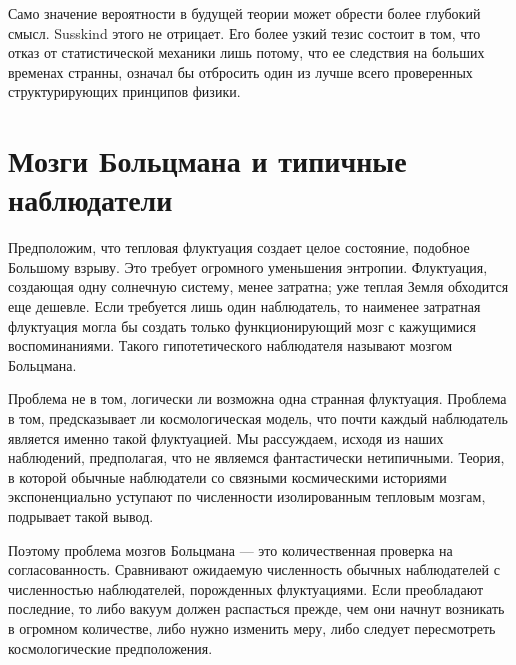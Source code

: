 \begin{classroomqa}
\end{classroomqa}

Само значение вероятности в будущей теории может обрести более глубокий смысл. Susskind этого не отрицает. Его более узкий тезис состоит в том, что отказ от статистической механики лишь потому, что ее следствия на больших временах странны, означал бы отбросить один из лучше всего проверенных структурирующих принципов физики.

\section{Мозги Больцмана и типичные наблюдатели}

Предположим, что тепловая флуктуация создает целое состояние, подобное Большому взрыву. Это требует огромного уменьшения энтропии. Флуктуация, создающая одну солнечную систему, менее затратна; уже теплая Земля обходится еще дешевле. Если требуется лишь один наблюдатель, то наименее затратная флуктуация могла бы создать только функционирующий мозг с кажущимися воспоминаниями. Такого гипотетического наблюдателя называют мозгом Больцмана.

Проблема не в том, логически ли возможна одна странная флуктуация. Проблема в том, предсказывает ли космологическая модель, что почти каждый наблюдатель является именно такой флуктуацией. Мы рассуждаем, исходя из наших наблюдений, предполагая, что не являемся фантастически нетипичными. Теория, в которой обычные наблюдатели со связными космическими историями экспоненциально уступают по численности изолированным тепловым мозгам, подрывает такой вывод.

Поэтому проблема мозгов Больцмана — это количественная проверка на согласованность. Сравнивают ожидаемую численность обычных наблюдателей с численностью наблюдателей, порожденных флуктуациями. Если преобладают последние, то либо вакуум должен распасться прежде, чем они начнут возникать в огромном количестве, либо нужно изменить меру, либо следует пересмотреть космологические предположения.

